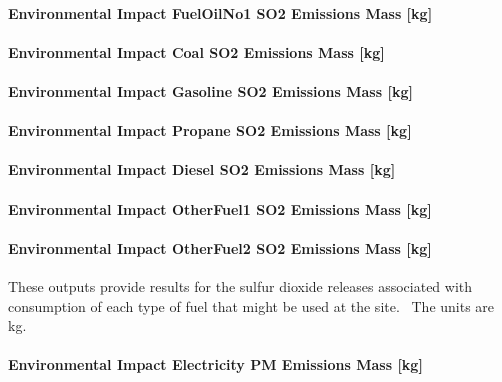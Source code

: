 \paragraph{Environmental Impact FuelOilNo1 SO2 Emissions Mass {[}kg{]}}\label{environmental-impact-fuel-oil-1-so2-emissions-mass-kg}

\paragraph{Environmental Impact Coal SO2 Emissions Mass {[}kg{]}}\label{environmental-impact-coal-so2-emissions-mass-kg}

\paragraph{Environmental Impact Gasoline SO2 Emissions Mass {[}kg{]}}\label{environmental-impact-gasoline-so2-emissions-mass-kg}

\paragraph{Environmental Impact Propane SO2 Emissions Mass {[}kg{]}}\label{environmental-impact-propane-so2-emissions-mass-kg}

\paragraph{Environmental Impact Diesel SO2 Emissions Mass {[}kg{]}}\label{environmental-impact-diesel-so2-emissions-mass-kg}

\paragraph{Environmental Impact OtherFuel1 SO2 Emissions Mass {[}kg{]}}\label{environmental-impact-otherfuel1-so2-emissions-mass-kg}

\paragraph{Environmental Impact OtherFuel2 SO2 Emissions Mass {[}kg{]}}\label{environmental-impact-otherfuel2-so2-emissions-mass-kg}

These outputs provide results for the sulfur dioxide releases associated with consumption of each type of fuel that might be used at the site.~ The units are kg.

\paragraph{Environmental Impact Electricity PM Emissions Mass {[}kg{]}}\label{environmental-impact-electricity-pm-emissions-mass-kg}

